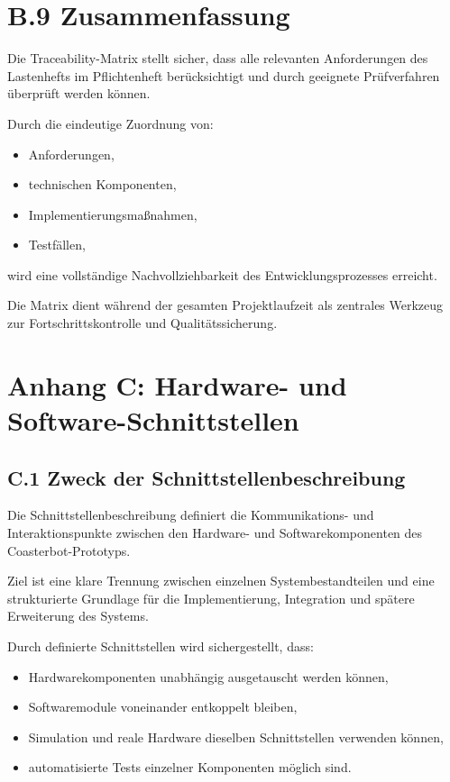 \documentclass[
]{article}
\providecommand{\tightlist}{%
  \setlength{\itemsep}{0pt}\setlength{\parskip}{0pt}}
\begin{document}
\section{B.9 Zusammenfassung}\label{b.9-zusammenfassung}

Die Traceability-Matrix stellt sicher, dass alle relevanten
Anforderungen des Lastenhefts im Pflichtenheft berücksichtigt und durch
geeignete Prüfverfahren überprüft werden können.

Durch die eindeutige Zuordnung von:

\begin{itemize}
\tightlist
\item
  Anforderungen,
\item
  technischen Komponenten,
\item
  Implementierungsmaßnahmen,
\item
  Testfällen,
\end{itemize}

wird eine vollständige Nachvollziehbarkeit des Entwicklungsprozesses
erreicht.

Die Matrix dient während der gesamten Projektlaufzeit als zentrales
Werkzeug zur Fortschrittskontrolle und Qualitätssicherung.

\section{Anhang C: Hardware- und
Software-Schnittstellen}\label{anhang-c-hardware--und-software-schnittstellen}

\subsection{C.1 Zweck der
Schnittstellenbeschreibung}\label{c.1-zweck-der-schnittstellenbeschreibung}

Die Schnittstellenbeschreibung definiert die Kommunikations- und
Interaktionspunkte zwischen den Hardware- und Softwarekomponenten des
Coasterbot-Prototyps.

Ziel ist eine klare Trennung zwischen einzelnen Systembestandteilen und
eine strukturierte Grundlage für die Implementierung, Integration und
spätere Erweiterung des Systems.

Durch definierte Schnittstellen wird sichergestellt, dass:

\begin{itemize}
\tightlist
\item
  Hardwarekomponenten unabhängig ausgetauscht werden können,
\item
  Softwaremodule voneinander entkoppelt bleiben,
\item
  Simulation und reale Hardware dieselben Schnittstellen verwenden
  können,
\item
  automatisierte Tests einzelner Komponenten möglich sind.
\end{itemize}
\end{document}
